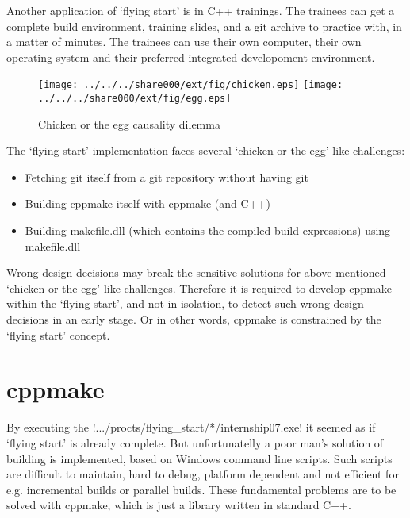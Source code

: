 Another application of `flying start' is in C++ trainings. The trainees
can get a complete build environment, training slides, and a git archive to
practice with, in a matter of minutes. The trainees can use their own
computer, their own operating system and their preferred integrated
developoment environment.

\begin{figure}[htb]
    \begin{center}
        \texttt{[image: ../../../share000/ext/fig/chicken.eps]}
		\hspace{2cm}
        \texttt{[image: ../../../share000/ext/fig/egg.eps]}
    \end{center}
    \caption{Chicken or the egg causality dilemma}
\end{figure}

The `flying start' implementation faces several `chicken or the egg'-like
challenges:
\begin{itemize}
\item Fetching git itself from a git repository without having git
\item Building cppmake itself with cppmake (and C++)
\item Building makefile.dll (which contains the compiled build expressions) 
      using makefile.dll
\end{itemize}
Wrong design decisions may break the sensitive solutions for above mentioned 
`chicken or the egg'-like challenges. Therefore it is required to develop
cppmake within the `flying start', and not in isolation, to detect such wrong
design decisions in an early stage. Or in other words, cppmake is constrained
by the `flying start' concept.

\section{cppmake}
\label{sec:internship01.assignment.cppmake}
By executing the !.../procts/flying_start/*/internship07.exe! it seemed as
if `flying start' is already complete. But unfortunatelly a poor man's
solution of building is implemented, based on Windows command line 
scripts. Such scripts are difficult to maintain, hard to debug, platform
dependent and not efficient for e.g. incremental builds or parallel 
builds. These fundamental problems are to be solved with cppmake, which is just
a library written in standard C++.

